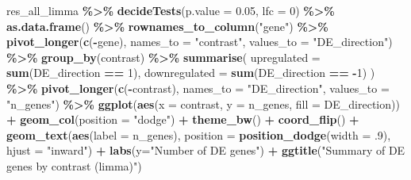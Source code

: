 \documentclass[
]{book}
\newenvironment{Shaded}{\begin{snugshade}}{\end{snugshade}}
\newcommand{\AttributeTok}[1]{\textcolor[rgb]{0.13,0.29,0.53}{#1}}
\newcommand{\DecValTok}[1]{\textcolor[rgb]{0.00,0.00,0.81}{#1}}
\newcommand{\FloatTok}[1]{\textcolor[rgb]{0.00,0.00,0.81}{#1}}
\newcommand{\FunctionTok}[1]{\textcolor[rgb]{0.13,0.29,0.53}{\textbf{#1}}}
\newcommand{\NormalTok}[1]{#1}
\newcommand{\SpecialCharTok}[1]{\textcolor[rgb]{0.81,0.36,0.00}{\textbf{#1}}}
\newcommand{\StringTok}[1]{\textcolor[rgb]{0.31,0.60,0.02}{#1}}
\begin{document}
\begin{Shaded}
\begin{Highlighting}[]
\NormalTok{res\_all\_limma }\SpecialCharTok{\%\textgreater{}\%}
  \FunctionTok{decideTests}\NormalTok{(}\AttributeTok{p.value =} \FloatTok{0.05}\NormalTok{, }\AttributeTok{lfc =} \DecValTok{0}\NormalTok{) }\SpecialCharTok{\%\textgreater{}\%}
  \FunctionTok{as.data.frame}\NormalTok{() }\SpecialCharTok{\%\textgreater{}\%}
  \FunctionTok{rownames\_to\_column}\NormalTok{(}\StringTok{"gene"}\NormalTok{) }\SpecialCharTok{\%\textgreater{}\%}
  \FunctionTok{pivot\_longer}\NormalTok{(}\FunctionTok{c}\NormalTok{(}\SpecialCharTok{{-}}\NormalTok{gene), }\AttributeTok{names\_to =} \StringTok{"contrast"}\NormalTok{, }\AttributeTok{values\_to =} \StringTok{"DE\_direction"}\NormalTok{) }\SpecialCharTok{\%\textgreater{}\%}
  \FunctionTok{group\_by}\NormalTok{(contrast) }\SpecialCharTok{\%\textgreater{}\%}
  \FunctionTok{summarise}\NormalTok{(}
    \AttributeTok{upregulated =} \FunctionTok{sum}\NormalTok{(DE\_direction }\SpecialCharTok{==} \DecValTok{1}\NormalTok{),}
    \AttributeTok{downregulated =} \FunctionTok{sum}\NormalTok{(DE\_direction }\SpecialCharTok{==} \SpecialCharTok{{-}}\DecValTok{1}\NormalTok{)}
\NormalTok{  ) }\SpecialCharTok{\%\textgreater{}\%}
  \FunctionTok{pivot\_longer}\NormalTok{(}\FunctionTok{c}\NormalTok{(}\SpecialCharTok{{-}}\NormalTok{contrast), }\AttributeTok{names\_to =} \StringTok{"DE\_direction"}\NormalTok{, }\AttributeTok{values\_to =} \StringTok{"n\_genes"}\NormalTok{) }\SpecialCharTok{\%\textgreater{}\%}
  \FunctionTok{ggplot}\NormalTok{(}\FunctionTok{aes}\NormalTok{(}\AttributeTok{x =}\NormalTok{ contrast, }\AttributeTok{y =}\NormalTok{ n\_genes, }\AttributeTok{fill =}\NormalTok{ DE\_direction)) }\SpecialCharTok{+}
  \FunctionTok{geom\_col}\NormalTok{(}\AttributeTok{position =} \StringTok{"dodge"}\NormalTok{) }\SpecialCharTok{+}
  \FunctionTok{theme\_bw}\NormalTok{() }\SpecialCharTok{+}
  \FunctionTok{coord\_flip}\NormalTok{() }\SpecialCharTok{+}
  \FunctionTok{geom\_text}\NormalTok{(}\FunctionTok{aes}\NormalTok{(}\AttributeTok{label =}\NormalTok{ n\_genes),}
            \AttributeTok{position =} \FunctionTok{position\_dodge}\NormalTok{(}\AttributeTok{width =}\NormalTok{ .}\DecValTok{9}\NormalTok{),}
            \AttributeTok{hjust =} \StringTok{"inward"}\NormalTok{) }\SpecialCharTok{+}
  \FunctionTok{labs}\NormalTok{(}\AttributeTok{y=}\StringTok{"Number of DE genes"}\NormalTok{) }\SpecialCharTok{+}
  \FunctionTok{ggtitle}\NormalTok{(}\StringTok{"Summary of DE genes by contrast (limma)"}\NormalTok{)}
\end{Highlighting}
\end{Shaded}
\end{document}
